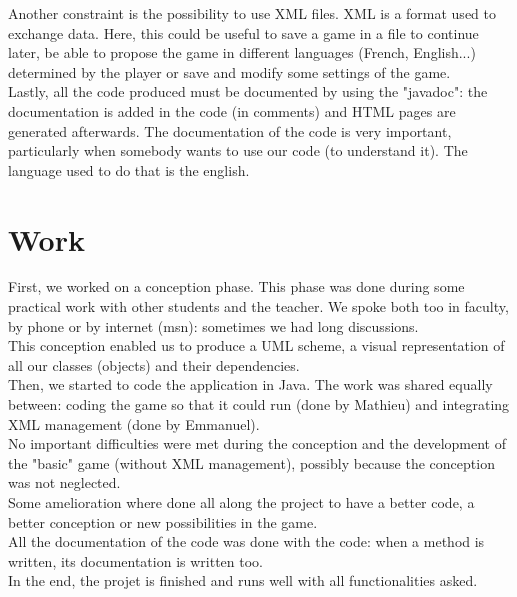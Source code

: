 \documentclass[a4paper,6pt]{article}
\begin{document}
Another constraint is the possibility to use XML files. XML is a format used to exchange data. Here, this could be useful to save a game in a file to continue later, be able to propose the game in different languages (French, English...) determined by the player or save and modify some settings of the game.\\

Lastly, all the code produced must be documented by using the "javadoc": the documentation is added in the code (in comments) and HTML pages are generated afterwards. The documentation of the code is very important, particularly when somebody wants to use our code (to understand it). The language used to do that is the english.\\


\section{Work}

First, we worked on a conception phase. This phase was done during some practical work with other students and the teacher. We spoke both too in faculty, by phone or by internet (msn): sometimes we had long discussions.\\
This conception enabled us to produce a UML scheme, a visual representation of all our classes (objects) and their dependencies.\\
Then, we started to code the application in Java. The work was shared equally between: coding the game so that it could run (done by Mathieu) and integrating XML management (done by Emmanuel).\\

No important difficulties were met during the conception and the development of the "basic" game (without XML management), possibly because the conception was not neglected.\\
Some amelioration where done all along the project to have a better code, a better conception or new possibilities in the game.\\

All the documentation of the code was done with the code: when a method is written, its documentation is written too.\\

In the end, the projet is finished and runs well with all functionalities asked.
\end{document}

